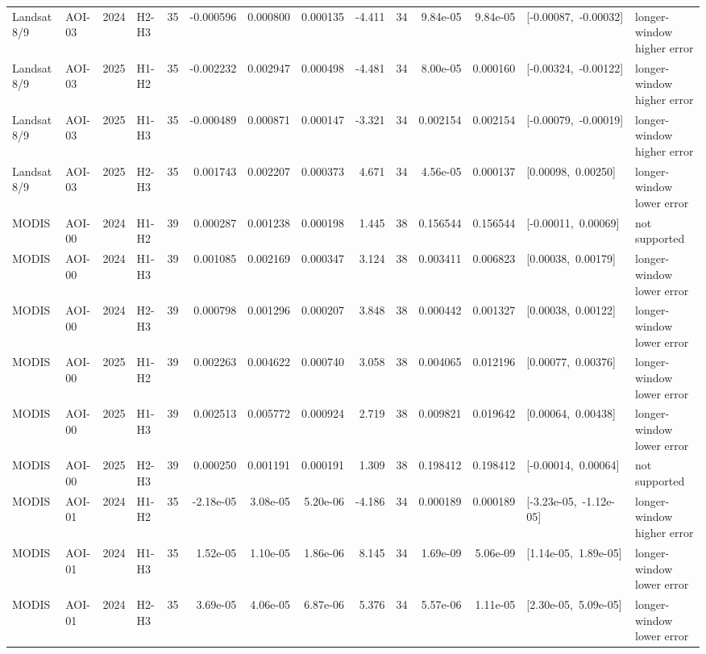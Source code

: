 \begin{longtable}{llclrrrrrrrrp{2.35cm}p{1.75cm}}
Landsat 8/9 & AOI-03 & 2024 & H2-H3 & 35 & -0.000596 & 0.000800 & 0.000135 & -4.411 & 34 & 9.84e-05 & 9.84e-05 & \mbox{[-0.00087, -0.00032]} & longer-window higher error \\
Landsat 8/9 & AOI-03 & 2025 & H1-H2 & 35 & -0.002232 & 0.002947 & 0.000498 & -4.481 & 34 & 8.00e-05 & 0.000160 & \mbox{[-0.00324, -0.00122]} & longer-window higher error \\
Landsat 8/9 & AOI-03 & 2025 & H1-H3 & 35 & -0.000489 & 0.000871 & 0.000147 & -3.321 & 34 & 0.002154 & 0.002154 & \mbox{[-0.00079, -0.00019]} & longer-window higher error \\
Landsat 8/9 & AOI-03 & 2025 & H2-H3 & 35 & 0.001743 & 0.002207 & 0.000373 & 4.671 & 34 & 4.56e-05 & 0.000137 & \mbox{[0.00098, 0.00250]} & longer-window lower error \\
MODIS & AOI-00 & 2024 & H1-H2 & 39 & 0.000287 & 0.001238 & 0.000198 & 1.445 & 38 & 0.156544 & 0.156544 & \mbox{[-0.00011, 0.00069]} & not supported \\
MODIS & AOI-00 & 2024 & H1-H3 & 39 & 0.001085 & 0.002169 & 0.000347 & 3.124 & 38 & 0.003411 & 0.006823 & \mbox{[0.00038, 0.00179]} & longer-window lower error \\
MODIS & AOI-00 & 2024 & H2-H3 & 39 & 0.000798 & 0.001296 & 0.000207 & 3.848 & 38 & 0.000442 & 0.001327 & \mbox{[0.00038, 0.00122]} & longer-window lower error \\
MODIS & AOI-00 & 2025 & H1-H2 & 39 & 0.002263 & 0.004622 & 0.000740 & 3.058 & 38 & 0.004065 & 0.012196 & \mbox{[0.00077, 0.00376]} & longer-window lower error \\
MODIS & AOI-00 & 2025 & H1-H3 & 39 & 0.002513 & 0.005772 & 0.000924 & 2.719 & 38 & 0.009821 & 0.019642 & \mbox{[0.00064, 0.00438]} & longer-window lower error \\
MODIS & AOI-00 & 2025 & H2-H3 & 39 & 0.000250 & 0.001191 & 0.000191 & 1.309 & 38 & 0.198412 & 0.198412 & \mbox{[-0.00014, 0.00064]} & not supported \\
MODIS & AOI-01 & 2024 & H1-H2 & 35 & -2.18e-05 & 3.08e-05 & 5.20e-06 & -4.186 & 34 & 0.000189 & 0.000189 & \mbox{[-3.23e-05, -1.12e-05]} & longer-window higher error \\
MODIS & AOI-01 & 2024 & H1-H3 & 35 & 1.52e-05 & 1.10e-05 & 1.86e-06 & 8.145 & 34 & 1.69e-09 & 5.06e-09 & \mbox{[1.14e-05, 1.89e-05]} & longer-window lower error \\
MODIS & AOI-01 & 2024 & H2-H3 & 35 & 3.69e-05 & 4.06e-05 & 6.87e-06 & 5.376 & 34 & 5.57e-06 & 1.11e-05 & \mbox{[2.30e-05, 5.09e-05]} & longer-window lower error \\

\end{longtable}
